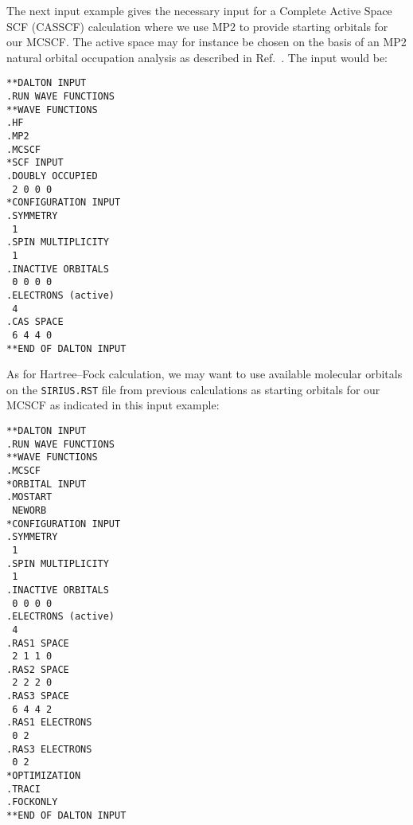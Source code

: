 \begin{center}
\end{center}

The next input example gives the necessary input for a Complete
Active Space SCF (CASSCF) calculation where we use MP2 to provide
starting orbitals
for our MCSCF. The
active space may for instance be
chosen on the basis of an MP2 natural orbital occupation
analysis as
described in Ref.~\cite{hjajpjhajojcp88}. The input would be:

\begin{verbatim}
**DALTON INPUT
.RUN WAVE FUNCTIONS
**WAVE FUNCTIONS
.HF
.MP2
.MCSCF
*SCF INPUT
.DOUBLY OCCUPIED
 2 0 0 0
*CONFIGURATION INPUT
.SYMMETRY
 1
.SPIN MULTIPLICITY
 1
.INACTIVE ORBITALS
 0 0 0 0
.ELECTRONS (active)
 4
.CAS SPACE
 6 4 4 0
**END OF DALTON INPUT
\end{verbatim}
\label{sirius_ex3}

As for Hartree--Fock calculation, we may want to use available
molecular orbitals on the \verb|SIRIUS.RST| file
from previous 
calculations as starting orbitals for our
MCSCF as indicated in this input example:

\begin{verbatim}
**DALTON INPUT
.RUN WAVE FUNCTIONS
**WAVE FUNCTIONS
.MCSCF
*ORBITAL INPUT
.MOSTART
 NEWORB
*CONFIGURATION INPUT
.SYMMETRY
 1
.SPIN MULTIPLICITY
 1
.INACTIVE ORBITALS
 0 0 0 0
.ELECTRONS (active)
 4
.RAS1 SPACE
 2 1 1 0
.RAS2 SPACE
 2 2 2 0
.RAS3 SPACE
 6 4 4 2
.RAS1 ELECTRONS
 0 2
.RAS3 ELECTRONS
 0 2
*OPTIMIZATION
.TRACI
.FOCKONLY
**END OF DALTON INPUT
\end{verbatim}
\label{sirius_ex4}

